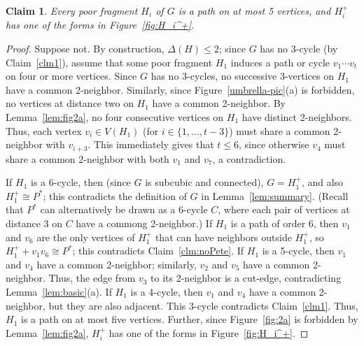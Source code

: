 \documentclass[12pt]{article}
\theoremstyle{plain}
\newtheorem{clm}{Claim}
\theoremstyle{definition}
\theoremstyle{remark}
\def\Hc{{H}}
\begin{document}
\begin{clm}
Every poor fragment $H_i$ of $G$ is a path on at most 5 vertices, and $H_i^+$
has one of the forms in Figure~\ref{fig:H_i^+}.  
\label{clm3}
\end{clm}
\begin{proof}
Suppose not.  
By construction, $\Delta(\Hc)\le 2$; since $G$ has no 3-cycle (by
Claim~\ref{clm1}), assume that some poor fragment $H_1$ induces a path or
cycle $v_1\cdots v_t$ on four or more vertices.  
Since $G$ has no 3-cycles, no successive 3-vertices on $H_1$ have a common
2-neighbor.  Similarly, since Figure~\ref{umbrella-pic}(a) is forbidden, no
vertices at distance two on $H_1$ have a common 2-neighbor.
By Lemma~\ref{lem:fig2a}, no four consecutive vertices on $H_1$ have distinct
2-neighbors.  Thus, each vertex $v_i\in V(H_1)$ (for $i \in \{1,\ldots,t-3\}$)
must share a common 2-neighbor with $v_{i+3}$. This immediately gives that $t
\le 6$, since otherwise $v_4$ must share a common 2-neighbor with both $v_1$
and $v_7$, a contradiction.

If $H_1$ is a 6-cycle, then (since $G$ is subcubic and connected), $G=H_1^+$,
and also $H_1^+\cong P^*$; this contradicts the definition of $G$ in
Lemma~\ref{lem:summary}.  (Recall that $P^*$ can alternatively be drawn as a
6-cycle $C$, where each pair of vertices at distance 3 on $C$ have a commong
2-neighbor.) If $H_1$ is a path of order 6, then $v_1$ and $v_6$
are the only vertices of $H_1^+$ that can have neighbors outside $H_1^+$, so
$H_1^++v_1v_6\cong P^*$; this contradicts Claim~\ref{clm:noPete}.
If $H_1$ is a 5-cycle, then $v_1$ and $v_4$ have a common 2-neighbor; similarly,
$v_2$ and $v_5$ have a common 2-neighbor.  Thus, the edge from $v_3$ to its
2-neighbor is a cut-edge, contradicting Lemma~\ref{lem:basic}(a).  If $H_1$ is a
4-cycle, then $v_1$ and $v_4$ have a common 2-neighbor, but they are also
adjacent.  This 3-cycle contradicts Claim~\ref{clm1}.
Thus, $H_1$ is a path on at most five vertices.  Further, since
Figure~\ref{fig:2a} is forbidden by Lemma~\ref{lem:fig2a}, $H_i^+$ has one of
the forms in Figure~\ref{fig:H_i^+}.
\end{proof}
\end{document}
